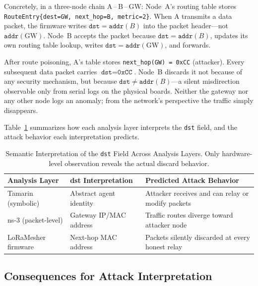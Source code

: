 \documentclass[preprint,12pt]{elsarticle}
\begin{document}
Concretely, in a three-node chain A\,--\,B\,--\,GW:
Node~A's routing table stores
\texttt{RouteEntry\{dest=GW, next\_hop=B, metric=2\}}.
When A transmits a data packet, the firmware writes
$\texttt{dst}=\texttt{addr}(B)$ into the packet header—not
$\texttt{addr}(\text{GW})$.
Node~B accepts the packet because $\texttt{dst}=\texttt{addr}(B)$,
updates its own routing table lookup, writes
$\texttt{dst}=\texttt{addr}(\text{GW})$, and forwards.

After route poisoning, A's table stores
\texttt{next\_hop(GW)\,=\,0xCC} (attacker).
Every subsequent data packet carries $\texttt{dst}=\texttt{0xCC}$.
Node~B discards it not because of any security mechanism, but
because $\texttt{dst}\neq\texttt{addr}(B)$—a silent misdirection
observable only from serial logs on the physical boards.
Neither the gateway nor any other node logs an anomaly;
from the network's perspective the traffic simply disappears.

Table~\ref{tab:dst-semantics} summarizes how each analysis layer
interprets the \texttt{dst} field, and the attack behavior each
interpretation predicts.

\begin{table}[t]
  \centering
  \caption{Semantic Interpretation of the \texttt{dst} Field Across Analysis Layers.
    Only hardware-level observation reveals the actual discard behavior.}
  \label{tab:dst-semantics}
  \setlength{\tabcolsep}{4pt}
  \begin{tabular}{p{2.6cm}p{3.0cm}p{3.5cm}}
    \toprule
    \textbf{Analysis Layer} & \textbf{dst Interpretation} & \textbf{Predicted Attack Behavior} \\
    \midrule
    Tamarin (symbolic) &
      Abstract agent identity &
      Attacker receives and can relay or modify packets \\
    ns-3 (packet-level) &
      Gateway IP/MAC address &
      Traffic routes diverge toward attacker node \\
    LoRaMesher firmware &
      Next-hop MAC address &
      Packets silently discarded at every honest relay \\
    \bottomrule
  \end{tabular}
\end{table}

\subsection{Consequences for Attack Interpretation}
\label{sec:cross-layer-consequences}
\end{document}
